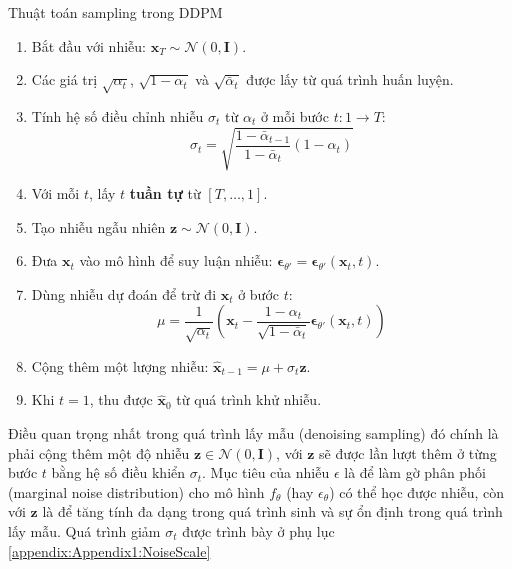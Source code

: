 \begin{algorithm}[H]
	\caption{Thuật toán sampling trong DDPM}
	\label{alg:samplingddpm}
	\setlength{\baselineskip}{10pt}
	\begin{enumerate}
		\item Bắt đầu với nhiễu: $\mathbf{x}_T \sim \mathcal{N}(0, \mathbf{I})$.
		
		\item Các giá trị $\sqrt{\alpha_t}$, $\sqrt{1 - \alpha_t}$ và $\sqrt{\bar{\alpha}_t}$ được lấy từ quá trình huấn luyện.
		
		\item Tính hệ số điều chỉnh nhiễu $\sigma_t$ từ $\alpha_t$ ở mỗi bước $t: 1 \rightarrow T$:
		\[
		\sigma_t = \sqrt{\frac{1 - \bar{\alpha}_{t-1}}{1 - \bar{\alpha}_t} (1 - \alpha_t)}
		\]
		
		\item Với mỗi $t$, lấy $t$ \textbf{tuần tự} từ $[T, \dots, 1]$.
		
		\item Tạo nhiễu ngẫu nhiên $\mathbf{z} \sim \mathcal{N}(0, \mathbf{I})$.
		
		\item Đưa $\mathbf{x}_t$ vào mô hình để suy luận nhiễu: $\boldsymbol{\epsilon}_{\theta'} = \boldsymbol{\epsilon}_{\theta'}(\mathbf{x}_t, t)$.
		
		\item Dùng nhiễu dự đoán để trừ đi $\mathbf{x}_t$ ở bước $t$:
		\[
		\mu = \frac{1}{\sqrt{\alpha_t}} \left( \mathbf{x}_t - \frac{1 - \alpha_t}{\sqrt{1 - \bar{\alpha}_t}} \boldsymbol{\epsilon}_{\theta'}(\mathbf{x}_t, t) \right)
		\]
		
		\item Cộng thêm một lượng nhiễu: $\hat{\mathbf{x}}_{t-1} = \mu + \sigma_t \mathbf{z}$.
		
		\item Khi $t = 1$, thu được $\hat{\mathbf{x}}_0$ từ quá trình khử nhiễu.
	\end{enumerate}

\end{algorithm}

Điều quan trọng nhất trong quá trình lấy mẫu (denoising sampling) đó chính là phải cộng thêm một độ nhiễu $\mathbf{z} \in \mathcal{N}(0, \mathbf{I})$, với $\mathbf{z}$  sẽ được lần lượt thêm ở từng bước $t$ bằng hệ số điều khiển $\sigma_t$. Mục tiêu của nhiễu $\epsilon$ là để  làm gờ phân phối (marginal noise distribution) cho mô hình $f_\theta$ (hay $\epsilon_{\theta}$) có thể học được nhiễu, còn với  $\mathbf{z}$ là để tăng tính đa dạng trong quá trình sinh và sự ổn định trong quá trình lấy mẫu. Quá trình giảm $\sigma_t$ được trình bày ở phụ lục \autoref{appendix:Appendix1:NoiseScale}


